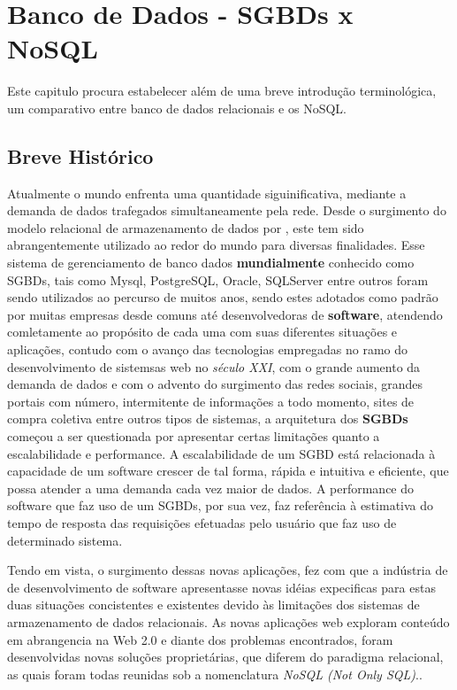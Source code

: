 \chapter{Banco de Dados - SGBDs x NoSQL}
\thispagestyle{empty}
Este capitulo procura estabelecer além de uma breve introdução terminológica, um comparativo entre banco de dados relacionais e os NoSQL.

\section{Breve Histórico}
Atualmente o mundo enfrenta uma quantidade siguinificativa, mediante a demanda de dados trafegados simultaneamente pela rede. Desde o surgimento do modelo
relacional de armazenamento de dados por \cite{CODD}, este tem sido abrangentemente utilizado ao redor do mundo para diversas finalidades. Esse sistema de 
gerenciamento de banco dados \textbf{mundialmente} conhecido como SGBDs, tais como Mysql, PostgreSQL, Oracle, SQLServer entre outros foram sendo utilizados ao 
percurso de muitos anos, sendo estes adotados como padrão por muitas empresas desde comuns até desenvolvedoras de \textbf{software}, atendendo comletamente ao
propósito de cada uma com suas diferentes situações e aplicações, contudo com o avanço das tecnologias empregadas no ramo do desenvolvimento de sistemsas web 
no \textit{século XXI}, com o grande aumento da demanda de dados e com o advento do surgimento das redes sociais, grandes portais com número, intermitente de
informações a todo momento, sites de compra coletiva entre outros tipos de sistemas, a arquitetura dos \textbf{SGBDs} começou a ser questionada por apresentar 
certas limitações quanto a escalabilidade e performance. A escalabilidade de um SGBD está relacionada à capacidade de um software crescer de tal forma, rápida
e intuitiva e eficiente, que possa atender a uma demanda cada vez maior de dados. A performance do software que faz uso de um SGBDs, por sua vez, faz referência
à estimativa do tempo de resposta das requisições efetuadas pelo usuário que faz uso de determinado sistema.

Tendo em vista, o surgimento dessas novas aplicações, fez com que a indústria de de desenvolvimento de software apresentasse novas idéias expecificas para estas
duas situações concistentes e existentes devido às limitações dos sistemas de armazenamento de dados relacionais. As novas aplicações web exploram conteúdo em 
abrangencia na Web 2.0 e diante dos problemas encontrados, foram desenvolvidas novas soluções proprietárias, que diferem do paradigma relacional, 
as quais foram todas reunidas sob a nomenclatura \textit{NoSQL (Not Only SQL)}.\cite{CUNHA}.

